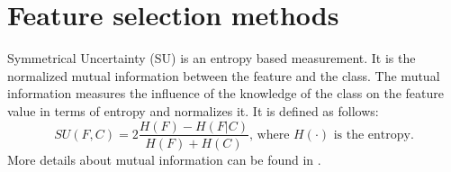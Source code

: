 \documentclass[twoside,11pt]{article}
\begin{document}
\section{Feature selection methods}
\label{sec:fs_methods}
Symmetrical Uncertainty (SU) \citep{press1996numerical} is an entropy based measurement. It is the normalized mutual information between the feature and the class. The mutual information measures the influence of the knowledge of the class on the feature value in terms of entropy and normalizes it. It is defined as follows:
\begin{equation}
  \label{eq:su}
  SU(F,C) = 2 \frac{H(F) - H(F|C)}{H(F) + H(C)} \textrm{, where } H(\cdot) \textrm{ is the entropy.}
\end{equation}
More details about mutual information can be found in \cite{paninski2003estimation}. 
\end{document}
